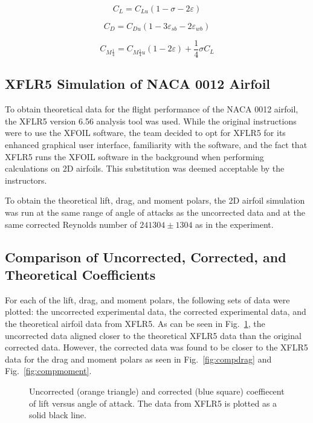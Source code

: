 \documentclass[journal,letterpaper]{IEEEtran}
\begin{document}
\begin{equation} \label{eq:liftu}
    C_L = C_{Lu} (1 - \sigma - 2\varepsilon)
\end{equation}

\begin{equation} \label{eq:dragu}
    C_D = C_{Du} (1 - 3\varepsilon_{sb} - 2\varepsilon_{wb})
\end{equation}

\begin{equation} \label{eq:Mu}
    C_{M\frac{1}{4}} = C_{M\frac{1}{4}u} (1 - 2\varepsilon) + \frac{1}{4}\sigma C_L  
\end{equation}

\subsection{XFLR5 Simulation of NACA 0012 Airfoil}

To obtain theoretical data for the flight performance of the NACA 0012 airfoil, the XFLR5 version 6.56 analysis tool was used.
While the original instructions were to use the XFOIL software, the team decided to opt for XFLR5 for its enhanced graphical user interface, familiarity with the software, and the fact that XFLR5 runs the XFOIL software in the background when performing calculations on 2D airfoils.
This substitution was deemed acceptable by the instructors.

To obtain the theoretical lift, drag, and moment polars, the 2D airfoil simulation was run at the same range of angle of attacks as the uncorrected data and at the same corrected Reynolds number of $241304 \pm 1304$ as in the experiment.

\subsection{Comparison of Uncorrected, Corrected, and Theoretical Coefficients}

For each of the lift, drag, and moment polars, the following sets of data were plotted: the uncorrected experimental data, the corrected experimental data, and the theoretical airfoil data from XFLR5.
As can be seen in Fig.~\ref{fig:complift}, the uncorrected data aligned closer to the theoretical XFLR5 data than the original corrected data.
However, the corrected data was found to be closer to the XFLR5 data for the drag and moment polars as seen in Fig.~\ref{fig:compdrag} and Fig.~\ref{fig:compmoment}. 

\begin{figure}[H]
    \centering
    
    \caption{Uncorrected (orange triangle) and corrected (blue square) coeffiecent of lift versus angle of attack. The data from XFLR5 is plotted as a solid black line.}
    \label{fig:complift}
\end{figure}
\end{document}
